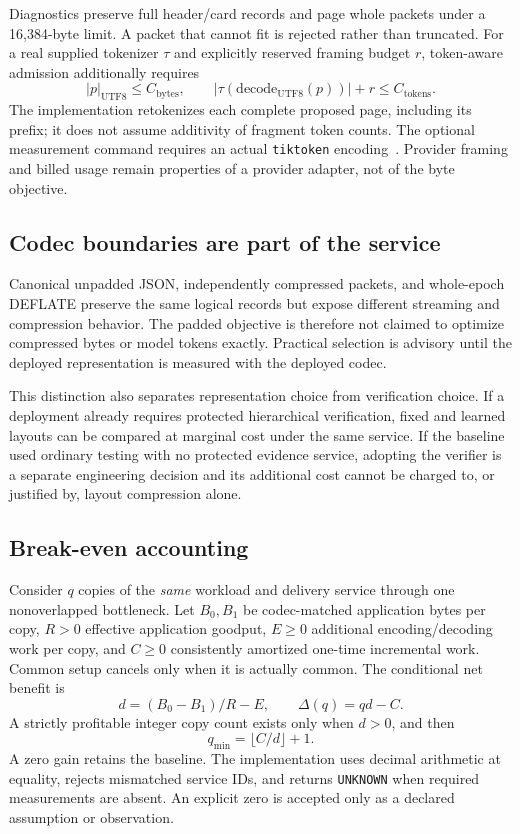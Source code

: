 Diagnostics preserve full header/card records and page whole packets under a 16,384-byte limit. A packet that cannot fit is rejected rather than truncated. For a real supplied tokenizer $\tau$ and explicitly reserved framing budget $r$, token-aware admission additionally requires
\begin{equation}
 |p|_{\mathrm{UTF8}}\le C_{\mathrm{bytes}},\qquad
 |\tau(\mathrm{decode}_{\mathrm{UTF8}}(p))|+r\le C_{\mathrm{tokens}}.
\end{equation}
The implementation retokenizes each complete proposed page, including its prefix; it does not assume additivity of fragment token counts. The optional measurement command requires an actual \texttt{tiktoken} encoding~\cite{tiktoken}. Provider framing and billed usage remain properties of a provider adapter, not of the byte objective.

\subsection{Codec boundaries are part of the service}
Canonical unpadded JSON, independently compressed packets, and whole-epoch DEFLATE preserve the same logical records but expose different streaming and compression behavior. The padded objective is therefore not claimed to optimize compressed bytes or model tokens exactly. Practical selection is advisory until the deployed representation is measured with the deployed codec.

This distinction also separates representation choice from verification choice. If a deployment already requires protected hierarchical verification, fixed and learned layouts can be compared at marginal cost under the same service. If the baseline used ordinary testing with no protected evidence service, adopting the verifier is a separate engineering decision and its additional cost cannot be charged to, or justified by, layout compression alone.

\subsection{Break-even accounting}\label{sec:breakeven}
Consider $q$ copies of the \emph{same} workload and delivery service through one nonoverlapped bottleneck. Let $B_0,B_1$ be codec-matched application bytes per copy, $R>0$ effective application goodput, $E\ge0$ additional encoding/decoding work per copy, and $C\ge0$ consistently amortized one-time incremental work. Common setup cancels only when it is actually common. The conditional net benefit is
\begin{equation}\label{eq:latency}
 d=(B_0-B_1)/R-E,\qquad \Delta(q)=qd-C.
\end{equation}
A strictly profitable integer copy count exists only when $d>0$, and then
\begin{equation}\label{eq:qmin}
 q_{\min}=\lfloor C/d\rfloor+1.
\end{equation}
A zero gain retains the baseline. The implementation uses decimal arithmetic at equality, rejects mismatched service IDs, and returns \texttt{UNKNOWN} when required measurements are absent. An explicit zero is accepted only as a declared assumption or observation.

